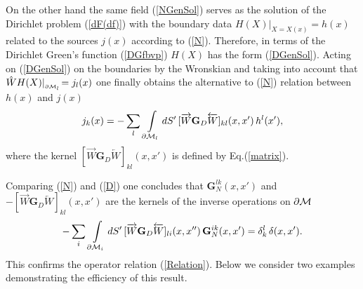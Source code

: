 \documentclass[a4paper,12pt]{article}
\newcommand{\dM}{{\partial \cal M}}
\newcommand{\GrD}{ \mathbf{G}_{D}}  %
\newcommand{\dS}{dS}
\begin{document}
On the other hand the same field (\ref{NGenSol}) serves as the
solution of the Dirichlet problem (\ref{dF(df)}) with the boundary
data $H(X)|_{X=X(x)}=h(x)$ related to the sources $j(x)$ according
to (\ref{N}). Therefore, in terms of the Dirichlet Green's
function  (\ref{DGfbvp}) $H(X)$ has the form (\ref{DGenSol}).
Acting on (\ref{DGenSol}) on the boundaries by the Wronskian and
taking into account that $\hat W H(X)|_{_{\dM_l}}\!=j_l(x)$ one
finally obtains the alternative to (\ref{N}) relation between
$h(x)$ and $j(x)$
    \begin{eqnarray}
     j_k(x)=-\sum_l\,\int \limits_{\dM_l}\dS'\,
     [\overrightarrow{W}\GrD
    \overleftarrow{W}]_{kl}(x,x')\,h^l(x'),       \label{D}
    \end{eqnarray}
where the kernel
$[\overrightarrow{W}\GrD\overleftarrow{W}]_{kl}(x,x')$ is defined
by Eq.(\ref{matrix}).

Comparing (\ref{N}) and (\ref{D}) one concludes that ${\mathbf
G}^{lk}_N(x,x')$ and
$-[\overrightarrow{W}\GrD\overleftarrow{W}]_{kl}(x,x')$ are the
kernels of the inverse operations on $\dM$
    \begin{eqnarray}
    -\sum_i\,\int \limits_{\dM_i}\dS'\,
     [\overrightarrow{W}\GrD
    \overleftarrow{W}]_{li}(x,x'')\,
    {\mathbf G}^{ik}_N(x,x')
    =\delta^l_k\,\delta(x,x').       \label{ND}
    \end{eqnarray}
This confirms the operator relation (\ref{Relation}). Below we
consider two examples demonstrating the efficiency of this result.
\end{document}
